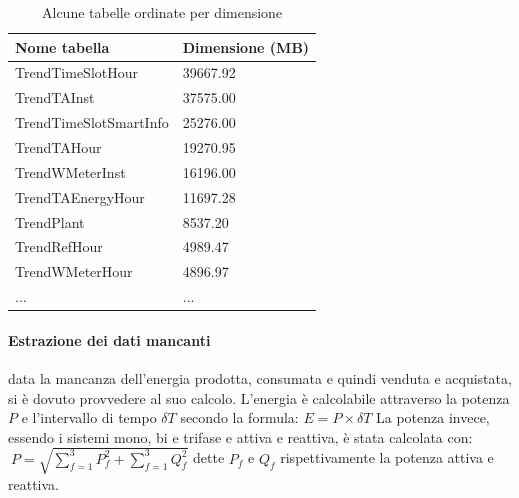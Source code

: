 \begin{table}[!ht]
    \begin{center}
        \caption{Alcune tabelle ordinate per dimensione}
        \label{tab:dim_ordered_tables}
        \begin{tabular}{l|l}
            \rowcolor{gray!50}
            \textbf{Nome tabella} & \textbf{Dimensione (MB)} \\
            \hline
            TrendTimeSlotHour & 39667.92\\
            TrendTAInst & 37575.00\\
            TrendTimeSlotSmartInfo & 25276.00\\
            TrendTAHour & 19270.95\\
            TrendWMeterInst & 16196.00\\
            TrendTAEnergyHour & 11697.28\\
            TrendPlant & 8537.20\\
            TrendRefHour & 4989.47\\
            TrendWMeterHour & 4896.97\\
            ... & ...\\
            \hline
        \end{tabular}
    \end{center}
\end{table}
\cite{ms_excel}

\paragraph{Estrazione dei dati mancanti}
data la mancanza dell'energia prodotta, consumata e quindi venduta e acquistata, si è dovuto provvedere al suo calcolo. L'energia è calcolabile attraverso la potenza \(P\) e l'intervallo di tempo \(\delta T\) secondo la formula: 
\(E = P\times \delta T \)
La potenza invece, essendo i sistemi mono, bi e trifase e attiva e reattiva, è stata calcolata con:
$\ P = \sqrt{\sum_{f=1}^{3} P_f^{2} + \sum_{f=1}^{3} Q_f^{2}}$
dette \(P_f\) e \(Q_f\) rispettivamente la potenza attiva e reattiva.

